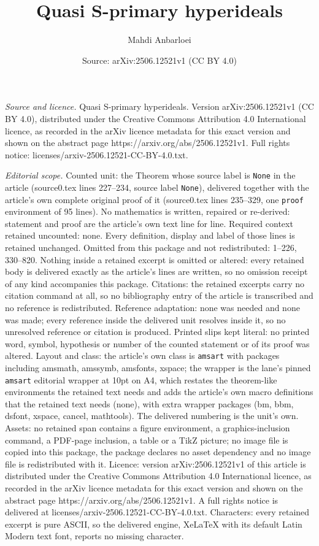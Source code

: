 \documentclass[10pt,a4paper]{amsart}
\title[Quasi S-primary hyperideals]{Quasi S-primary hyperideals}
\author{Mahdi Anbarloei}
\date{Source: arXiv:2506.12521v1 (CC BY 4.0)}
\begin{document}
\maketitle

\noindent\emph{Source and licence.} Quasi S-primary hyperideals. Version arXiv:2506.12521v1 (CC BY 4.0), distributed under the Creative Commons Attribution 4.0 International licence, as recorded in the arXiv licence metadata for this exact version and shown on the abstract page https://arxiv.org/abs/2506.12521v1. Full rights notice: licenses/arxiv-2506.12521-CC-BY-4.0.txt.\par\smallskip

\noindent\textit{Editorial scope.} Counted unit: the Theorem whose source label is \texttt{None} in the article (source0.tex lines 227--234, source label \texttt{None}), delivered together with the article's own complete original proof of it (source0.tex lines 235--329, one \texttt{proof} environment of 95 lines). No mathematics is written, repaired or re-derived: statement and proof are the article's own text line for line. Required context retained uncounted: none. Every definition, display and label of those lines is retained unchanged. Omitted from this package and not redistributed: 1--226, 330--820. Nothing inside a retained excerpt is omitted or altered: every retained body is delivered exactly as the article's lines are written, so no omission receipt of any kind accompanies this package. Citations: the retained excerpts carry no citation command at all, so no bibliography entry of the article is transcribed and no reference is redistributed. Reference adaptation: none was needed and none was made; every reference inside the delivered unit resolves inside it, so no unresolved reference or citation is produced. Printed slips kept literal: no printed word, symbol, hypothesis or number of the counted statement or of its proof was altered. Layout and class: the article's own class is \texttt{amsart} with packages including amsmath, amssymb, amsfonts, xspace; the wrapper is the lane's pinned \texttt{amsart} editorial wrapper at 10pt on A4, which restates the theorem-like environments the retained text needs and adds the article's own macro definitions that the retained text needs (none), with extra wrapper packages (bm, bbm, dsfont, xspace, cancel, mathtools). The delivered numbering is the unit's own. Assets: no retained span contains a figure environment, a graphics-inclusion command, a PDF-page inclusion, a table or a TikZ picture; no image file is copied into this package, the package declares no asset dependency and no image file is redistributed with it. Licence: version arXiv:2506.12521v1 of this article is distributed under the Creative Commons Attribution 4.0 International licence, as recorded in the arXiv licence metadata for this exact version and shown on the abstract page https://arxiv.org/abs/2506.12521v1. A full rights notice is delivered at licenses/arxiv-2506.12521-CC-BY-4.0.txt. Characters: every retained excerpt is pure ASCII, so the delivered engine, XeLaTeX with its default Latin Modern text font, reports no missing character.
\end{document}
